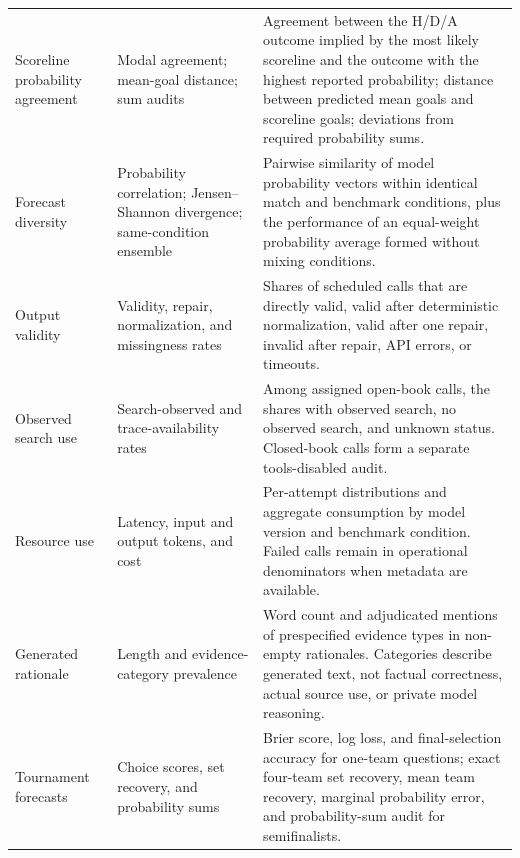 \documentclass[sigconf,nonacm]{acmart}
\begin{document}
\begin{table}[t]
\begin{tabularx}{\textwidth}{>{\raggedright\arraybackslash}p{}
    >{\raggedright\arraybackslash}p{}X}
    Scoreline probability agreement &
    Modal agreement; mean-goal distance; sum audits &
    Agreement between the H/D/A outcome implied by the most likely scoreline and the outcome with the highest reported probability; distance between predicted mean goals and scoreline goals; deviations from required probability sums. \\

    Forecast diversity &
    Probability correlation; Jensen--Shannon divergence; same-condition ensemble &
    Pairwise similarity of model probability vectors within identical match and benchmark conditions, plus the performance of an equal-weight probability average formed without mixing conditions. \\

    Output validity &
    Validity, repair, normalization, and missingness rates &
    Shares of scheduled calls that are directly valid, valid after deterministic normalization, valid after one repair, invalid after repair, API errors, or timeouts. \\

    Observed search use &
    Search-observed and trace-availability rates &
    Among assigned open-book calls, the shares with observed search, no observed search, and unknown status. Closed-book calls form a separate tools-disabled audit. \\

    Resource use &
    Latency, input and output tokens, and cost &
    Per-attempt distributions and aggregate consumption by model version and benchmark condition. Failed calls remain in operational denominators when metadata are available. \\

    Generated rationale &
    Length and evidence-category prevalence &
    Word count and adjudicated mentions of prespecified evidence types in non-empty rationales. Categories describe generated text, not factual correctness, actual source use, or private model reasoning. \\

    Tournament forecasts &
    Choice scores, set recovery, and probability sums &
    Brier score, log loss, and final-selection accuracy for one-team questions; exact four-team set recovery, mean team recovery, marginal probability error, and probability-sum audit for semifinalists. \\
    \bottomrule
  \end{tabularx}
\end{table}
\end{document}

